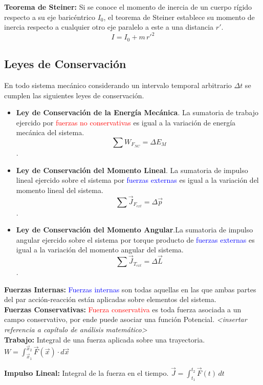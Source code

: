 \documentclass[12pt,a4paper]{article}
\begin{document}
\textbf{Teorema de Steiner:} Si se conoce el momento de inercia de un cuerpo rígido respecto a su eje baricéntrico $I_0$, el teorema de Steiner establece su momento de inercia respecto a cualquier otro eje paralelo a este a una distancia $r'$.
$$I = I_0 + m \, r'^2$$

\subsection{Leyes de Conservación} 
En todo sistema mecánico considerando un intervalo temporal arbitrario $\Delta t$ se cumplen las siguientes leyes de conservación.\\

\begin{itemize}
	\item \textbf{Ley de Conservación de la Energía Mecánica}. La sumatoria de trabajo ejercido por \textcolor{red}{fuerzas no conservativas} es igual a la variación de energía mecánica del sistema. $$\sum{W_{F_{NC}}} = \Delta E_M$$.
	\item \textbf{Ley de Conservación del Momento Lineal}. La sumatoria de impulso lineal ejercido sobre el sistema por \textcolor{blue}{fuerzas externas} es igual a la variación del momento lineal del sistema. $$\sum{\vec{J}_{F_{ext}}} = \Delta \vec{p}$$.
	\item \textbf{Ley de Conservación del Momento Angular}.La sumatoria de impulso angular ejercido sobre el sistema por torque producto de \textcolor{blue}{fuerzas externas} es igual a la variación del momento angular del sistema.
	$$\sum{\vec{J}_{T_{ext}}} = \Delta \vec{L}$$.
\end{itemize}

\textbf{Fuerzas Internas:} \textcolor{blue}{Fuerzas internas} son todas aquellas en las que ambas partes del par acción-reacción están aplicadas sobre elementos del sistema.\\

\textbf{Fuerzas Conservativas:} \textcolor{red}{Fuerza conservativa} es toda fuerza asociada a un campo conservativo, por ende puede asociar una función Potencial. \textit{<insertar referencia a capítulo de análisis matemático>}\\

\textbf{Trabajo:} Integral de una fuerza aplicada sobre una trayectoria. $\displaystyle W=\int_{\vec{x}_1}^{\vec{x}_2}\vec{F}(\vec{x})\cdot d\vec{x}$

\textbf{Impulso Lineal:} Integral de la fuerza en el tiempo. $\displaystyle \vec{J}=\int_{t_1}^{t_2}\vec{F}(t)\, dt$
\end{document}
